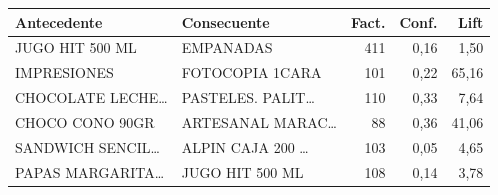 \begin{tabular}{llrrr}
\toprule
\textbf{Antecedente} & \textbf{Consecuente} & \textbf{Fact.} & \textbf{Conf.} & \textbf{Lift} \\
\midrule
JUGO HIT 500 ML & EMPANADAS & 411 & 0,16 & 1,50 \\
IMPRESIONES & FOTOCOPIA 1CARA & 101 & 0,22 & 65,16 \\
CHOCOLATE LECHE… & PASTELES. PALIT… & 110 & 0,33 & 7,64 \\
CHOCO CONO 90GR & ARTESANAL MARAC… & 88 & 0,36 & 41,06 \\
SANDWICH SENCIL… & ALPIN CAJA 200 … & 103 & 0,05 & 4,65 \\
PAPAS MARGARITA… & JUGO HIT 500 ML & 108 & 0,14 & 3,78 \\
\bottomrule
\end{tabular}
